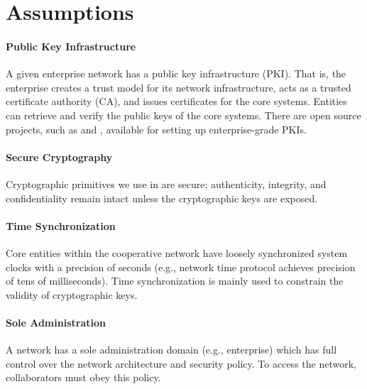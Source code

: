 


\section{Assumptions}
\label{sec:assumptions}

\paragraph{Public Key Infrastructure} 
A given enterprise network has a public key infrastructure (PKI). That is, the enterprise
creates a trust model for its network infrastructure, acts as a trusted certificate authority 
(CA), and issues certificates for the core systems. Entities can retrieve and verify the
public keys of the core systems. There are open source projects, such as  and , available for setting up enterprise-grade PKIs.

\paragraph{Secure Cryptography} 
Cryptographic primitives we use in \name are secure; authenticity, integrity, and 
confidentiality remain intact unless the cryptographic keys are exposed.

\paragraph{Time Synchronization}
Core entities within the cooperative network have loosely synchronized system clocks with a
precision of seconds (e.g., network time protocol achieves precision of tens of milliseconds). 
Time synchronization is mainly used to constrain the validity of cryptographic keys.

\paragraph{Sole Administration}
A network has a sole administration domain (e.g., enterprise) which has full control over 
the network architecture and security policy. To access the network, collaborators 
must obey this policy.